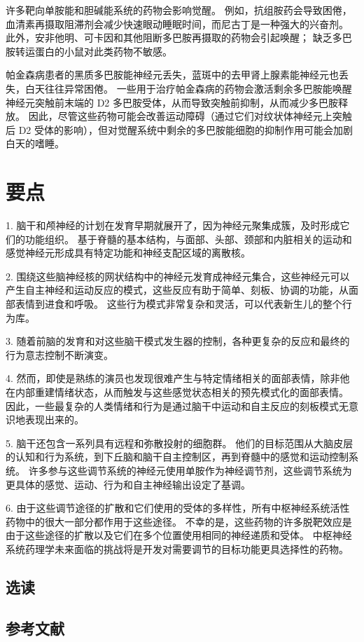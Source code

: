 许多靶向单胺能和胆碱能系统的药物会影响觉醒。 例如，抗组胺药会导致困倦，血清素再摄取阻滞剂会减少快速眼动睡眠时间，而尼古丁是一种强大的兴奋剂。 此外，安非他明、可卡因和其他阻断多巴胺再摄取的药物会引起唤醒； 缺乏多巴胺转运蛋白的小鼠对此类药物不敏感。

帕金森病患者的黑质多巴胺能神经元丢失，蓝斑中的去甲肾上腺素能神经元也丢失，白天往往异常困倦。 一些用于治疗帕金森病的药物会激活剩余多巴胺能唤醒神经元突触前末端的 D2 多巴胺受体，从而导致突触前抑制，从而减少多巴胺释放。 因此，尽管这些药物可能会改善运动障碍（通过它们对纹状体神经元上突触后 D2 受体的影响），但对觉醒系统中剩余的多巴胺能细胞的抑制作用可能会加剧白天的嗜睡。

\section{要点}
1. 脑干和颅神经的计划在发育早期就展开了，因为神经元聚集成簇，及时形成它们的功能组织。 基于脊髓的基本结构，与面部、头部、颈部和内脏相关的运动和感觉神经元形成具有特定功能和神经支配区域的离散核。 

2. 围绕这些脑神经核的网状结构中的神经元发育成神经元集合，这些神经元可以产生自主神经和运动反应的模式，这些反应有助于简单、刻板、协调的功能，从面部表情到进食和呼吸。 这些行为模式非常复杂和灵活，可以代表新生儿的整个行为库。 

3. 随着前脑的发育和对这些脑干模式发生器的控制，各种更复杂的反应和最终的行为意志控制不断演变。 

4. 然而，即使是熟练的演员也发现很难产生与特定情绪相关的面部表情，除非他在内部重建情绪状态，从而触发与这些感觉状态相关的预先模式化的面部表情。 因此，一些最复杂的人类情绪和行为是通过脑干中运动和自主反应的刻板模式无意识地表现出来的。 

5. 脑干还包含一系列具有远程和弥散投射的细胞群。 他们的目标范围从大脑皮层的认知和行为系统，到下丘脑和脑干自主控制区，再到脊髓中的感觉和运动控制系统。 许多参与这些调节系统的神经元使用单胺作为神经调节剂，这些调节系统为更具体的感觉、运动、行为和自主神经输出设定了基调。 

6. 由于这些调节途径的扩散和它们使用的受体的多样性，所有中枢神经系统活性药物中的很大一部分都作用于这些途径。 不幸的是，这些药物的许多脱靶效应是由于这些途径的扩散以及它们在多个位置使用相同的神经递质和受体。 中枢神经系统药理学未来面临的挑战将是开发对需要调节的目标功能更具选择性的药物。

\subsection{选读}
\subsection{参考文献}
